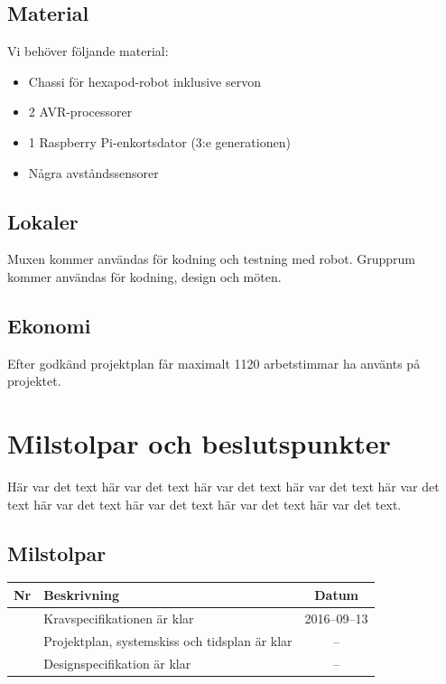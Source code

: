 \documentclass[a4paper,titlepage,12pt]{article}
\newcounter{milNr}
\newcommand{\nextMilNr}{\stepcounter{milNr}\arabic{milNr}}
\begin{document}
	\subsection{Material}
	Vi behöver följande material:
    \begin{itemize}
            \item Chassi för hexapod-robot inklusive servon
            \item 2 AVR-processorer
            \item 1 Raspberry Pi-enkortsdator (3:e generationen)
            \item Några avståndssensorer %
    \end{itemize}
	
	
	\subsection{Lokaler}
    Muxen kommer användas för kodning och testning med robot. Grupprum kommer
    användas för kodning, design och möten.
	
	
	\subsection{Ekonomi}
    Efter godkänd projektplan får maximalt 1120 arbetstimmar ha använts på projektet.
	
	
	\section{Milstolpar och beslutspunkter}
	Här var det text här var det text här var det text
	här var det text här var det text här var det text
	här var det text här var det text här var det text.
	
	
	\subsection{Milstolpar}
	\begin{longtable}[c]{ c l c}
		\textbf{Nr} & \textbf{Beskrivning} & \textbf{Datum} \\ \midrule
		\nextMilNr{} & Kravspecifikationen är klar & 2016--09--13 \\ \midrule
		\nextMilNr{} & Projektplan, systemskiss och tidsplan är klar & -- \\ \midrule
		\nextMilNr{} & Designspecifikation är klar & -- \\ \midrule
	\end{longtable}
	
\end{document}
